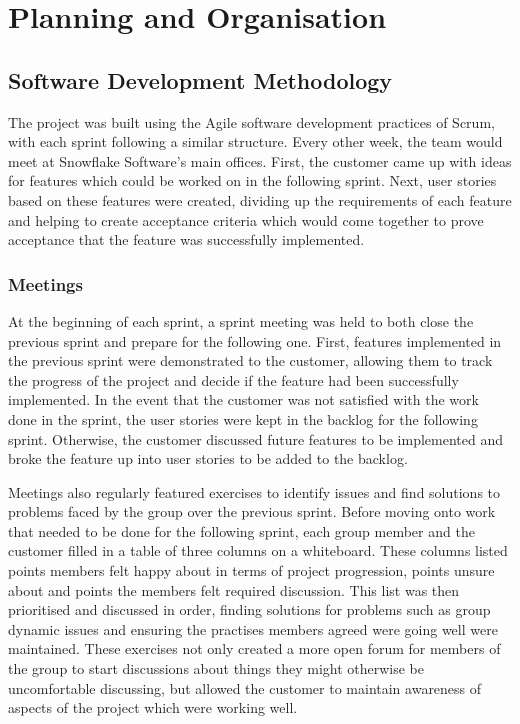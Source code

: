 \documentclass[a4paper, 12pt, twoside]{article}
\begin{document}
\newpage

\section{Planning and Organisation}
\label{sec:planning}

\subsection{Software Development Methodology}
\label{sec:plan_software_development_methodology}

The project was built using the Agile software development practices of Scrum, with each sprint following a similar structure. Every other week, the team would meet at Snowflake Software's main offices. First, the customer came up with ideas for features which could be worked on in the following sprint. Next, user stories based on these features were created, dividing up the requirements of each feature and helping to create acceptance criteria which would come together to prove acceptance that the feature was successfully implemented.

\subsubsection{Meetings} 

At the beginning of each sprint, a sprint meeting was held to both close the previous sprint and prepare for the following one. First, features implemented in the previous sprint were demonstrated to the customer, allowing them to track the progress of the project and decide if the feature had been successfully implemented. In the event that the customer was not satisfied with the work done in the sprint, the user stories were kept in the backlog for the following sprint. Otherwise, the customer discussed future features to be implemented and broke the feature up into user stories to be added to the backlog.

Meetings also regularly featured exercises to identify issues and find solutions to problems faced by the group over the previous sprint. Before moving onto work that needed to be done for the following sprint, each group member and the customer filled in a table of three columns on a whiteboard. These columns listed points members felt happy about in terms of project progression, points unsure about and points the members felt required discussion. This list was then prioritised and discussed in order, finding solutions for problems such as group dynamic issues and ensuring the practises members agreed were going well were maintained. These exercises not only created a more open forum for members of the group to start discussions about things they might otherwise be uncomfortable discussing, but allowed the customer to maintain awareness of aspects of the project which were working well.
\end{document}
